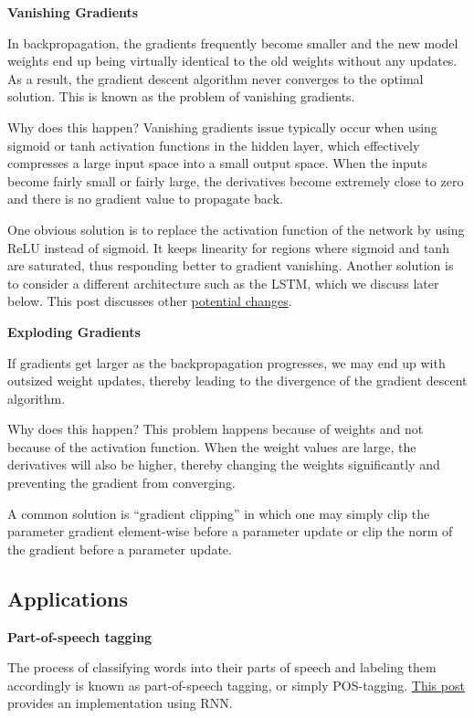 \documentclass[
]{book}
\begin{document}
\textbf{Vanishing Gradients}

In backpropagation, the gradients frequently become smaller and the new model weights end up being virtually identical to the old weights without any updates. As a result, the gradient descent algorithm never converges to the optimal solution. This is known as the problem of vanishing gradients.

Why does this happen? Vanishing gradients issue typically occur when using sigmoid or tanh activation functions in the hidden layer, which effectively compresses a large input space into a small output space. When the inputs become fairly small or fairly large, the derivatives become extremely close to zero and there is no gradient value to propagate back.

One obvious solution is to replace the activation function of the network by using ReLU instead of sigmoid. It keeps linearity for regions where sigmoid and tanh are saturated, thus responding better to gradient vanishing. Another solution is to consider a different architecture such as the LSTM, which we discuss later below. This post discusses other \href{https://datascience.stackexchange.com/questions/72351/how-to-prevent-vanishing-gradient-or-exploding-gradient}{potential changes}.

\textbf{Exploding Gradients}

If gradients get larger as the backpropagation progresses, we may end up with outsized weight updates, thereby leading to the divergence of the gradient descent algorithm.

Why does this happen? This problem happens because of weights and not because of the activation function. When the weight values are large, the derivatives will also be higher, thereby changing the weights significantly and preventing the gradient from converging.

A common solution is ``gradient clipping'' in which one may simply clip the parameter gradient element-wise before a parameter update or clip the norm of the gradient before a parameter update.

\hypertarget{applications}{%
\subsection{Applications}\label{applications}}

\textbf{Part-of-speech tagging}

The process of classifying words into their parts of speech and labeling them accordingly is known as part-of-speech tagging, or simply POS-tagging. \href{https://towardsdatascience.com/pos-tagging-using-rnn-7f08a522f849}{This post} provides an implementation using RNN.
\end{document}
